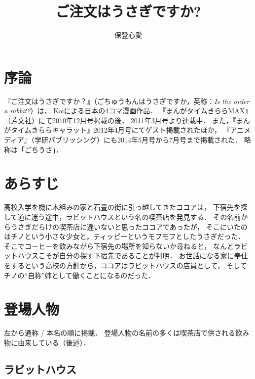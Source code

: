 \documentclass[a4paper, 12pt, oneside, report, uplatex]{jsbook}
\title{ご注文はうさぎですか?}%
\author{保登心愛}%
\begin{document}
    \maketitle

    \frontmatter %
    \tableofcontents

    \mainmatter %
    \chapter{序論}
    \label{chap:序論} %

    『ご注文はうさぎですか？』（ごちゅうもんはうさぎですか，英称：\textit{Is the order a rabbit?}）は，
    Koiによる日本の4コマ漫画作品．
    『まんがタイムきららMAX』（芳文社）にて2010年12月号掲載の後，
    2011年3月号より連載中．
    また，『まんがタイムきららキャラット』2012年4月号にてゲスト掲載されたほか，
    『アニメディア』（学研パブリッシング）にも2014年5月号から7月号まで掲載された．
    略称は「ごちうさ」．

    \chapter{あらすじ}
    \label{chap:あらすじ}

    高校入学を機に木組みの家と石畳の街に引っ越してきたココアは，
    下宿先を探して道に迷う途中，ラビットハウスという名の喫茶店を発見する．
    その名前からうさぎだらけの喫茶店に違いないと思ったココアであったが，
    そこにいたのはチノという小さな少女と，ティッピーというモフモフとしたうさぎだった．
    そこでコーヒーを飲みながら下宿先の場所を知らないか尋ねると，
    なんとラビットハウスこそが自分の探す下宿先であることが判明．
    お世話になる家に奉仕をするという高校の方針から，ココアはラビットハウスの店員として，
    そしてチノの``自称''姉として働くことになるのだった．

    \chapter{登場人物}
    \label{chap:登場人物}

    左から通称 / 本名の順に掲載．
    登場人物の名前の多くは喫茶店で供される飲み物に由来している（後述）．

    \section{ラビットハウス}
    \label{sec:ラビットハウス}
\end{document}
